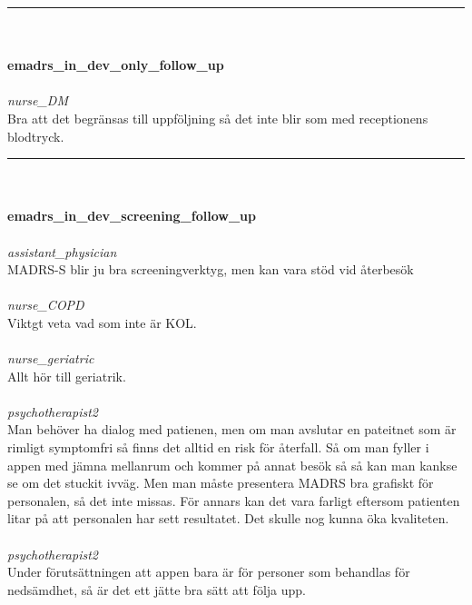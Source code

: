 \documentclass[12pt,a4paper,oneside]{article}
\begin{document}
\hrule
\ \\\ \\{\bf emadrs\_in\_dev\_only\_follow\_up }
\\\ \\%
 { \it \it nurse\_DM %
}\\ 
Bra att det begr{\"a}nsas till uppf{\"o}ljning s{\aa} det inte blir som med receptionens blodtryck. %


\hrule
\ \\\ \\{\bf emadrs\_in\_dev\_screening\_follow\_up }
\\\ \\%
 { \it assistant\_physician %
}\\ 
MADRS-S blir ju bra screeningverktyg, men kan vara st{\"o}d vid {\aa}terbes{\"o}k %
\ \\\ \\
 { \it   nurse\_COPD %
}\\ 
Viktgt veta vad som inte {\"a}r KOL. %
\ \\\ \\
 { \it   nurse\_geriatric %
}\\ 
Allt h{\"o}r till geriatrik.  %
\ \\\ \\
 { \it   psychotherapist2 %
}\\ 
Man beh{\"o}ver ha dialog med patienen, men om man avslutar en pateitnet som {\"a}r rimligt symptomfri s{\aa} finns det alltid en risk f{\"o}r {\aa}terfall. S{\aa} om man fyller i appen med j{\"a}mna mellanrum och kommer p{\aa} annat bes{\"o}k s{\aa} s{\aa} kan man kankse se om det stuckit ivv{\"a}g. Men man m{\aa}ste presentera MADRS bra grafiskt f{\"o}r personalen, s{\aa} det inte missas. F{\"o}r annars kan det vara farligt eftersom patienten litar p{\aa} att personalen har sett resultatet. Det skulle nog kunna {\"o}ka kvaliteten.  %
\ \\\ \\
 { \it   psychotherapist2 %
}\\ 
Under f{\"o}ruts{\"a}ttningen att appen bara {\"a}r f{\"o}r personer som behandlas f{\"o}r neds{\"a}mdhet, s{\aa} {\"a}r det ett j{\"a}tte bra s{\"a}tt att f{\"o}lja upp. %
\end{document}

